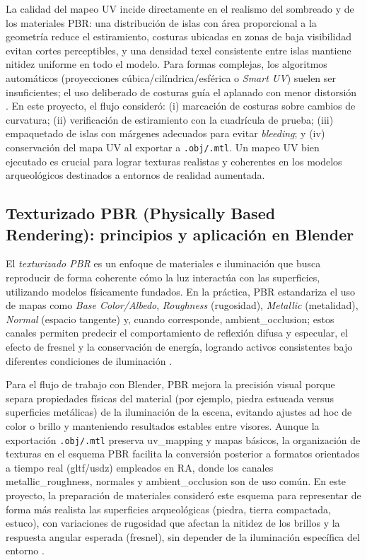 La calidad del mapeo UV incide directamente en el realismo del sombreado y de los materiales \gls{PBR}: una distribución de islas con área proporcional a la geometría reduce el estiramiento, costuras ubicadas en zonas de baja visibilidad evitan cortes perceptibles, y una densidad texel consistente entre islas mantiene nitidez uniforme en todo el modelo. Para formas complejas, los algoritmos automáticos (proyecciones cúbica/cilíndrica/esférica o \textit{Smart UV}) suelen ser insuficientes; el uso deliberado de costuras guía el aplanado con menor distorsión \cite{BlenderManual291UV}. En este proyecto, el flujo consideró: (i) marcación de costuras sobre cambios de curvatura; (ii) verificación de estiramiento con la cuadrícula de prueba; (iii) empaquetado de islas con márgenes adecuados para evitar \textit{bleeding}; y (iv) conservación del mapa UV al exportar a \texttt{.obj/.mtl}. Un mapeo UV bien ejecutado es crucial para lograr texturas realistas y coherentes en los modelos arqueológicos destinados a entornos de realidad aumentada.


\subsection*{Texturizado PBR (Physically Based Rendering): principios y aplicación en Blender}

El \textit{\gls{texturizado} \gls{PBR}} es un enfoque de materiales e iluminación que busca reproducir de forma coherente cómo la luz interactúa con las superficies, utilizando modelos físicamente fundados. En la práctica, \gls{PBR} estandariza el uso de mapas como \textit{Base Color/Albedo}, \textit{Roughness} (rugosidad), \textit{Metallic} (metalidad), \textit{Normal} (espacio tangente) y, cuando corresponde, \gls{ambient_occlusion}; estos canales permiten predecir el comportamiento de reflexión difusa y especular, el efecto de \gls{fresnel} y la conservación de energía, logrando activos consistentes bajo diferentes condiciones de iluminación \cite{AdobePBR}.

Para el flujo de trabajo con Blender, \gls{PBR} mejora la precisión visual porque separa propiedades físicas del material (por ejemplo, piedra estucada versus superficies metálicas) de la iluminación de la escena, evitando ajustes ad hoc de color o brillo y manteniendo resultados estables entre visores. Aunque la exportación \texttt{.obj/.mtl} preserva \gls{uv_mapping} y mapas básicos, la organización de texturas en el esquema \gls{PBR} facilita la conversión posterior a formatos orientados a tiempo real (\gls{gltf}/\gls{usdz}) empleados en RA, donde los canales \gls{metallic_roughness}, \gls{normales} y \gls{ambient_occlusion} son de uso común. En este proyecto, la preparación de materiales consideró este esquema para representar de forma más realista las superficies arqueológicas (piedra, tierra compactada, estuco), con variaciones de rugosidad que afectan la nitidez de los brillos y la respuesta angular esperada (\gls{fresnel}), sin depender de la iluminación específica del entorno \cite{AdobePBR}.


